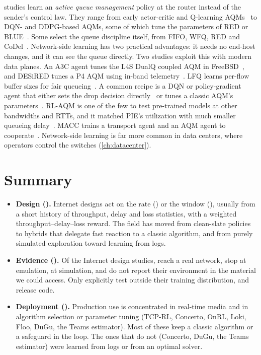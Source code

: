 \nTopicAQM{} studies learn an \emph{active queue management} policy at the router instead of the sender's control law. They range from early actor-critic and Q-learning AQMs~\cite{xu2018network,gomez2019intelligent,jiang2020performance} to DQN- and DDPG-based AQMs, some of which tune the parameters of RED or BLUE~\cite{yousif2022intelligent,matrood2024adaptive,mohammed2026ddpg}. Some select the queue discipline itself, from FIFO, WFQ, RED and CoDel~\cite{liu2026q}. Network-side learning has two practical advantages: it needs no end-host changes, and it can see the queue directly. Two studies exploit this with modern data planes. An A3C agent tunes the L4S DualQ coupled AQM in FreeBSD~\cite{satish2024active}, and DESiRED tunes a P4 AQM using in-band telemetry~\cite{almeida2024desired}. LFQ learns per-flow buffer sizes for fair queueing~\cite{bachl2020lfq}. A common recipe is a DQN or policy-gradient agent that either sets the drop decision directly~\cite{alwahab2021deep,kim2021deep,jin2019dynamic,ali2024tcp} or tunes a classic AQM's parameters~\cite{su2018qred,liu2022active,yousif2022applying,zhang2026reinforcement}. RL-AQM is one of the few to test pre-trained models at other bandwidths and RTTs, and it matched PIE's utilization with much smaller queueing delay~\cite{alwahab2021deep}. MACC trains a transport agent and an AQM agent to cooperate~\cite{bai2022macc}. Network-side learning is far more common in data centers, where operators control the switches (\cref{ch:datacenter}).

\section{Summary}
\label{sec:internet-summary}

\begin{itemize}
  \item \textbf{Design ().} Internet designs act on the rate (\nChInternetActRate) or the window (\nChInternetActCwnd), usually from a short history of throughput, delay and loss statistics, with a weighted throughput--delay--loss reward. The field has moved from clean-slate policies to hybrids that delegate fast reaction to a classic algorithm, and from purely simulated exploration toward learning from logs.
  \item \textbf{Evidence ().} Of the \nChInternetDesign{} Internet design studies, \nChInternetReal{} reach a real network, \nChInternetEmu{} stop at emulation, \nChInternetSim{} at simulation, and \nChInternetNR{} do not report their environment in the material we could access. Only \nChInternetGen{} explicitly test outside their training distribution, and \nChInternetCode{} release code.
  \item \textbf{Deployment ().} Production use is concentrated in real-time media and in algorithm selection or parameter tuning (TCP-RL, Concerto, OnRL, Loki, Floo, DuGu, the Teams estimator). Most of these keep a classic algorithm or a safeguard in the loop. The ones that do not (Concerto, DuGu, the Teams estimator) were learned from logs or from an optimal solver.
\end{itemize}
